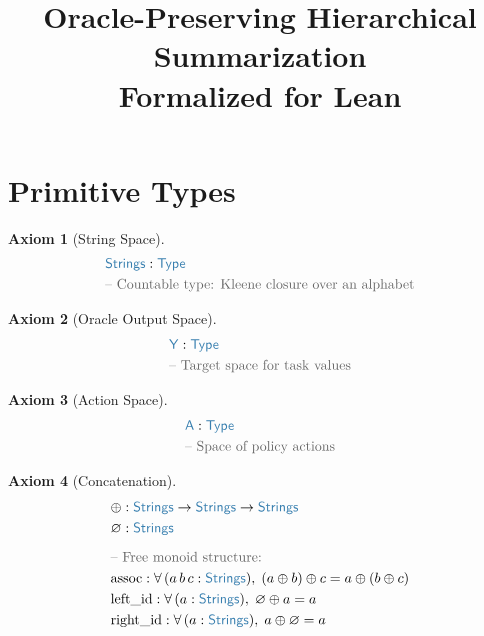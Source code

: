 \documentclass[11pt]{article}
\title{Oracle-Preserving Hierarchical Summarization\\[0.3em]
\large Formalized for Lean}
\author{}
\date{}
\theoremstyle{definition}
\newtheorem{axiomenv}{Axiom}
\theoremstyle{plain}
\newcommand{\ty}[1]{\textcolor{type}{\mathsf{#1}}}
\newcommand{\fn}[1]{\mathrm{#1}}
\newcommand{\cmt}[1]{\textcolor{comment}{\text{-- #1}}}
\newcommand{\all}{\forall\,}
\newcommand{\arr}{\to}
\newcommand{\Strings}{\ty{Strings}}
\newcommand{\Y}{\ty{Y}}
\newcommand{\A}{\ty{A}}
\newcommand{\Type}{\ty{Type}}
\newcommand{\concat}{\oplus}
\newcommand{\emptystr}{\varnothing}
\begin{document}
\maketitle

\tableofcontents
\newpage

\section{Primitive Types}
\label{sec:types}

\begin{axiomenv}[String Space]
\label{ax:strings}
\begin{align*}
&\Strings : \Type \\
&\cmt{Countable type: Kleene closure over an alphabet}
\end{align*}
\end{axiomenv}

\begin{axiomenv}[Oracle Output Space]
\label{ax:Y}
\begin{align*}
&\Y : \Type \\
&\cmt{Target space for task values}
\end{align*}
\end{axiomenv}

\begin{axiomenv}[Action Space]
\label{ax:A}
\begin{align*}
&\A : \Type \\
&\cmt{Space of policy actions}
\end{align*}
\end{axiomenv}

\begin{axiomenv}[Concatenation]
\label{ax:concat}
\begin{align*}
&\concat : \Strings \arr \Strings \arr \Strings \\
&\emptystr : \Strings \\[6pt]
&\cmt{Free monoid structure:} \\
&\fn{assoc} : \all (a\, b\, c : \Strings),\; (a \concat b) \concat c = a \concat (b \concat c) \\
&\fn{left\_id} : \all (a : \Strings),\; \emptystr \concat a = a \\
&\fn{right\_id} : \all (a : \Strings),\; a \concat \emptystr = a
\end{align*}
\end{axiomenv}
\end{document}
